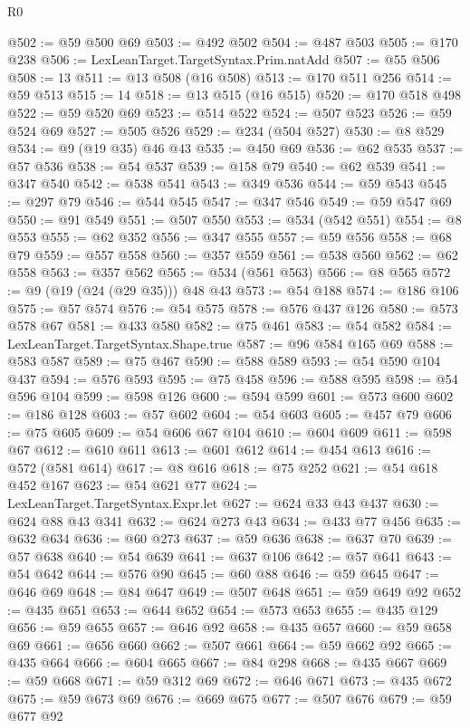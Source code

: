 \begin{lexlean}{R0}
\begin{coremodule}
@502 := @59 @500 @69
@503 := @492 @502
@504 := @487 @503
@505 := @170 @238
@506 := LexLeanTarget.TargetSyntax.Prim.natAdd
@507 := @55 @506
@508 := 13
@511 := @13 @508 (@16 @508)
@513 := @170 @511 @256
@514 := @59 @513
@515 := 14
@518 := @13 @515 (@16 @515)
@520 := @170 @518 @498
@522 := @59 @520 @69
@523 := @514 @522
@524 := @507 @523
@526 := @59 @524 @69
@527 := @505 @526
@529 := @234 (@504 @527)
@530 := @8 @529
@534 := @9 (@19 @35) @46 @43
@535 := @450 @69
@536 := @62 @535
@537 := @57 @536
@538 := @54 @537
@539 := @158 @79
@540 := @62 @539
@541 := @347 @540
@542 := @538 @541
@543 := @349 @536
@544 := @59 @543
@545 := @297 @79
@546 := @544 @545
@547 := @347 @546
@549 := @59 @547 @69
@550 := @91 @549
@551 := @507 @550
@553 := @534 (@542 @551)
@554 := @8 @553
@555 := @62 @352
@556 := @347 @555
@557 := @59 @556
@558 := @68 @79
@559 := @557 @558
@560 := @357 @559
@561 := @538 @560
@562 := @62 @558
@563 := @357 @562
@565 := @534 (@561 @563)
@566 := @8 @565
@572 := @9 (@19 (@24 (@29 @35))) @48 @43
@573 := @54 @188
@574 := @186 @106
@575 := @57 @574
@576 := @54 @575
@578 := @576 @437 @126
@580 := @573 @578 @67
@581 := @433 @580
@582 := @75 @461
@583 := @54 @582
@584 := LexLeanTarget.TargetSyntax.Shape.true
@587 := @96 @584 @165 @69
@588 := @583 @587
@589 := @75 @467
@590 := @588 @589
@593 := @54 @590 @104 @437
@594 := @576 @593
@595 := @75 @458
@596 := @588 @595
@598 := @54 @596 @104
@599 := @598 @126
@600 := @594 @599
@601 := @573 @600
@602 := @186 @128
@603 := @57 @602
@604 := @54 @603
@605 := @457 @79
@606 := @75 @605
@609 := @54 @606 @67 @104
@610 := @604 @609
@611 := @598 @67
@612 := @610 @611
@613 := @601 @612
@614 := @454 @613
@616 := @572 (@581 @614)
@617 := @8 @616
@618 := @75 @252
@621 := @54 @618 @452 @167
@623 := @54 @621 @77
@624 := LexLeanTarget.TargetSyntax.Expr.let
@627 := @624 @33 @43 @437
@630 := @624 @88 @43 @341
@632 := @624 @273 @43
@634 := @433 @77 @456
@635 := @632 @634
@636 := @60 @273
@637 := @59 @636
@638 := @637 @70
@639 := @57 @638
@640 := @54 @639
@641 := @637 @106
@642 := @57 @641
@643 := @54 @642
@644 := @576 @90
@645 := @60 @88
@646 := @59 @645
@647 := @646 @69
@648 := @84 @647
@649 := @507 @648
@651 := @59 @649 @92
@652 := @435 @651
@653 := @644 @652
@654 := @573 @653
@655 := @435 @129
@656 := @59 @655
@657 := @646 @92
@658 := @435 @657
@660 := @59 @658 @69
@661 := @656 @660
@662 := @507 @661
@664 := @59 @662 @92
@665 := @435 @664
@666 := @604 @665
@667 := @84 @298
@668 := @435 @667
@669 := @59 @668
@671 := @59 @312 @69
@672 := @646 @671
@673 := @435 @672
@675 := @59 @673 @69
@676 := @669 @675
@677 := @507 @676
@679 := @59 @677 @92

\end{coremodule}
\end{lexlean}
